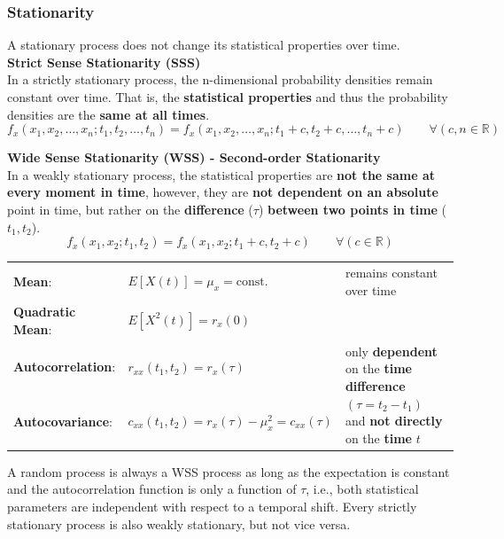 		\subsubsection{Stationarity}
		A stationary process does not change its statistical properties over time. \\
		
		\textbf{Strict Sense Stationarity (SSS)}\\
		In a strictly stationary process, the n-dimensional probability densities remain constant over
		time. That is, the \textbf{statistical properties} and thus the probability densities are the
		\textbf{same at all times}.
		$$ f_x(x_1, x_2, \ldots, x_n; t_1, t_2, \ldots, t_n) =
				f_x(x_1, x_2, \ldots, x_n; t_1+c, t_2+c, \ldots, t_n+c) \qquad \forall (c,n \in
				\mathbb{R})$$
		
		\textbf{Wide Sense Stationarity (WSS) - Second-order Stationarity}\\
		In a weakly stationary process, the statistical properties are \textbf{not the same at every
		moment in time}, however, they are \textbf{not dependent on an absolute} point in time, but
		rather on the \textbf{difference} ($\tau$) \textbf{between two points in time} ($t_1, t_2$).  \\ 
		$$ f_x(x_1, x_2; t_1, t_2) = f_x(x_1, x_2; t_1+c, t_2+c) \qquad \forall (c \in
				\mathbb{R})$$
		\renewcommand{\arraystretch}{1.4}
		\begin{tabular}[c]{ p{3.3cm}  p{6.5cm} p{8cm} }
			\textbf{Mean}:     &  $E[X(t)] = \mu_{x} = \text{const.}$  
									& remains constant over time\\ 
			\textbf{Quadratic Mean}:    &  $E[X^{2}(t)] = r_{x}(0)$  \\ 
			\textbf{Autocorrelation}:   &   $r_{xx}(t_{1},t_{2}) = r_{x}(\tau)$
			& \multirow{2}{8cm}{only \textbf{dependent} on the \textbf{time difference} $(\tau = t_2 - t_1)$ and \textbf{not directly} on
			 the \textbf{time} $t$} \\
			 \textbf{Autocovariance}:        & $ c_{xx}(t_{1},t_{2}) = r_{x}(\tau) - \mu_{x}^{2} = c_{xx}(\tau)$ \\
		\end{tabular}
		\renewcommand{\arraystretch}{1}
		 
		A random process is always a WSS process as long as the expectation is constant and the autocorrelation function is only a function of $\tau$, i.e., both 
		statistical parameters are independent with respect to a temporal shift.    
		Every strictly stationary process is also weakly stationary, but not vice versa. 
		
